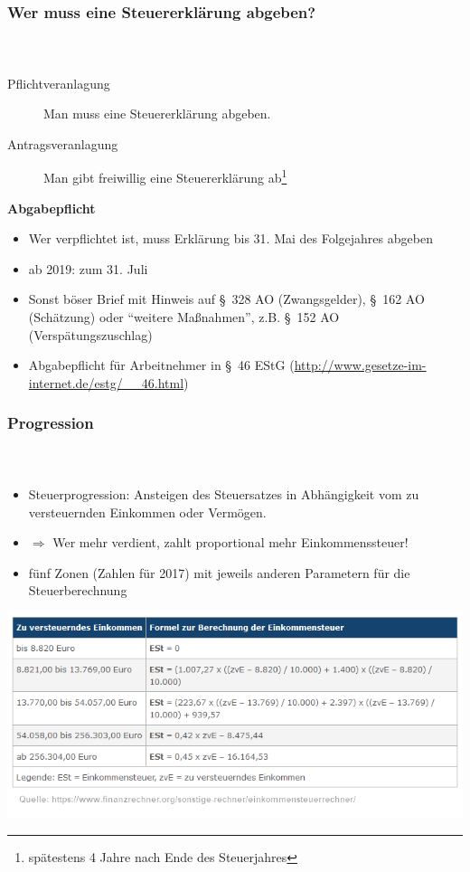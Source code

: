 \documentclass[ngerman]{beamer}
\begin{document}
\begin{frame}
\frametitle{Wer muss eine Steuererklärung abgeben?}
\framesubtitle{~}

\begin{description}
\item[Pflichtveranlagung] Man muss eine Steuererklärung abgeben.
\item[Antragsveranlagung] Man gibt freiwillig eine Steuererklärung ab\footnote{spätestens 4 Jahre nach Ende des Steuerjahres}
\end{description}

\textbf{Abgabepflicht}

\begin{itemize}
	\item Wer verpflichtet ist, muss Erklärung bis 31. Mai des Folgejahres abgeben
	\item ab 2019: zum 31. Juli
	\item Sonst böser Brief mit Hinweis auf §~328 AO (Zwangsgelder), §~162 AO (Schätzung) oder \enquote{weitere Maßnahmen}, z.B. §~152 AO (Verspätungszuschlag)
	\item Abgabepflicht für Arbeitnehmer in §~46 EStG (\url{http://www.gesetze-im-internet.de/estg/__46.html})
\end{itemize}

\end{frame}



\begin{frame}
\frametitle{Progression}
\framesubtitle{~}

\begin{itemize}
\item Steuerprogression: Ansteigen des Steuersatzes in Abhängigkeit vom zu versteuernden Einkommen oder Vermögen. 
\item $\Rightarrow$ Wer mehr verdient, zahlt proportional mehr Einkommenssteuer!
\item fünf Zonen (Zahlen für 2017) mit jeweils anderen Parametern für die Steuerberechnung
\end{itemize}


\includegraphics[width=\textwidth]{Bilder/Formeln}

\end{frame}
\end{document}
